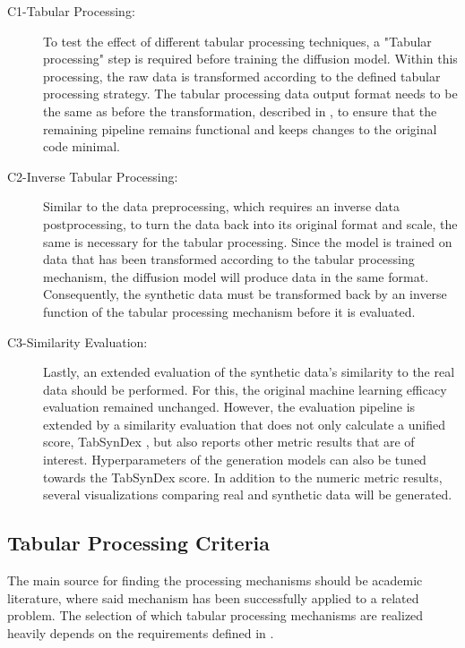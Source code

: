 \begin{description}
	\item[C1-Tabular Processing:] To test the effect of different tabular processing techniques, a "Tabular processing" step is required before training the diffusion model.
		Within this processing, the raw data is transformed according to the defined tabular processing strategy.
		The tabular processing data output format needs to be the same as before the transformation, described in , to ensure
		that the remaining pipeline remains functional and keeps changes to the original code minimal.
	\item[C2-Inverse Tabular Processing:] Similar to the data preprocessing, which requires an inverse data postprocessing, to turn the data back into its original format and scale, the same is necessary for the tabular processing.
		Since the model is trained on data that has been transformed according to the tabular processing mechanism, the diffusion model will produce data in the same format.
		Consequently, the synthetic data must be transformed back by an inverse function of the tabular processing mechanism before it is evaluated.
	\item[C3-Similarity Evaluation:] Lastly, an extended evaluation of the synthetic data's similarity to the real data should be performed.
		For this, the original machine learning efficacy evaluation remained unchanged.
		However, the evaluation pipeline is extended by a similarity evaluation that does not only calculate a unified score, TabSynDex \cite{chundawat2022UniversalMetricRobust}, but also reports other metric results that are of interest.
		Hyperparameters of the generation models can also be tuned towards the TabSynDex score.
		In addition to the numeric metric results, several visualizations comparing real and synthetic data will be generated.
\end{description}

\subsection{Tabular Processing Criteria}
\label{ch:Concept-criteria}

The main source for finding the processing mechanisms should be academic literature, where said mechanism has been successfully applied to a related problem.
The selection of which tabular processing mechanisms are realized heavily depends on the requirements defined in .

